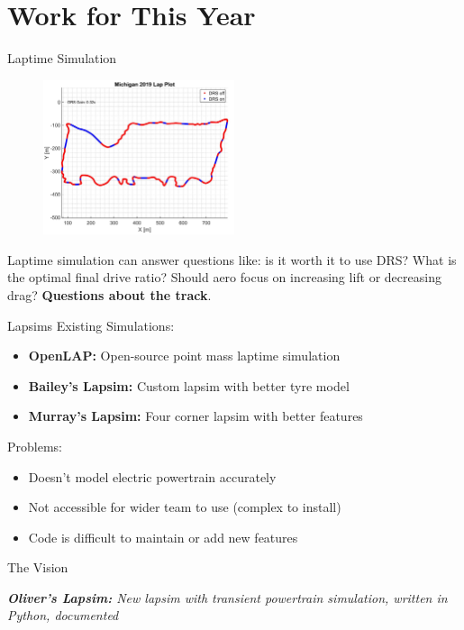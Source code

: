 \section*{Work for This Year}

\begin{frame}{Laptime Simulation}
    \begin{figure}
        \includegraphics[width=0.5\textwidth]{res/DRS Simulation.png}
    \end{figure}
    Laptime simulation can answer questions like:
    is it worth it to use DRS\@?
    What is the optimal final drive ratio?
    Should aero focus on increasing lift or decreasing drag?
    \textbf{Questions about the track}.
\end{frame}

\begin{frame}{Lapsims}
    Existing Simulations:
    \begin{itemize}
        \item \textbf{OpenLAP:} Open-source point mass laptime simulation
        \item \textbf{Bailey's Lapsim:} Custom lapsim with better tyre model
        \item \textbf{Murray's Lapsim:} Four corner lapsim  with better features
    \end{itemize}
    Problems:
    \begin{itemize}
        \item Doesn't model electric powertrain accurately
        \item Not accessible for wider team to use (complex to install)
        \item Code is difficult to maintain or add new features
    \end{itemize}
    \begin{block}{The Vision}
        \begin{center}
            \textit{\textbf{Oliver's Lapsim:}
                New lapsim with transient powertrain simulation,
                written in Python, documented}
        \end{center}
    \end{block}
\end{frame}

